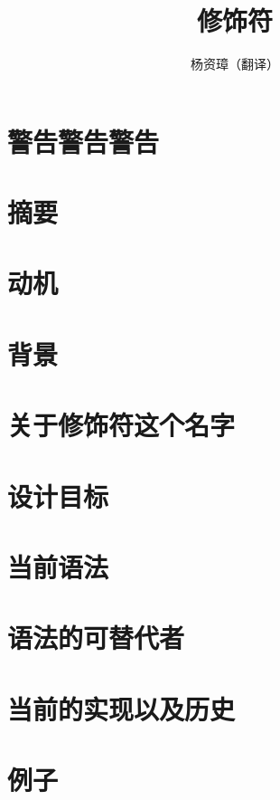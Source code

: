 \documentclass{ctexart}
\title{修饰符}
\author{杨资璋（翻译）}
\begin{document}
\maketitle
\section{警告警告警告}

\section{摘要}

\section{动机}

\section{背景}

\section{关于修饰符这个名字}
\section{设计目标}

\section{当前语法}
\section{语法的可替代者}
\section{当前的实现以及历史}
\section{例子}
\end{document}
